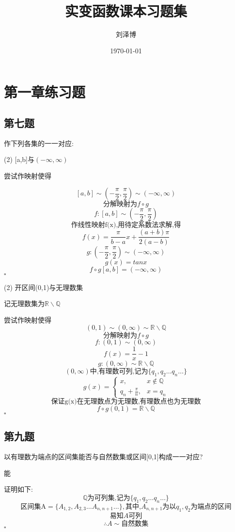 \documentclass[a4paper]{article}
\title{实变函数课本习题集}
\author{刘泽博}
\date{\today}
\begin{document}
    \maketitle
    \tableofcontents
    \section{第一章练习题}
    \subsection{第七题}
    作下列各集的一一对应:

    (2) [a,b]与$(-\infty,\infty)$
    
    尝试作映射使得

    \[[a,b] \sim (-\frac{\pi}{2},\frac{\pi}{2}) \sim (-\infty,\infty)\]
    \[\text{分解映射为}f\circ g\]
    \[f:[a,b] \sim (-\frac{\pi}{2},\frac{\pi}{2})\]
    \[\text{作线性映射f(x),用待定系数法求解,得}\]
    \[f(x)=\frac{\pi}{b-a}x+\frac{(a+b)\pi}{2(a-b)}\]
    \[g:(-\frac{\pi}{2},\frac{\pi}{2}) \sim (-\infty,\infty)\]
    \[g(x)=tanx\]
    \[f\circ g [a,b] =(-\infty,\infty)\]
    \hfill $\square$

    (2) 开区间(0,1)与无理数集

    记无理数集为$\mathbb{R}\backslash\mathbb{Q}$

    尝试作映射使得
    \[(0,1) \sim (0,\infty) \sim \mathbb{R}\backslash\mathbb{Q}\]
    \[\text{分解映射为}f\circ g\]
    \[f:(0,1) \sim (0,\infty)\]
    \[f(x)=\frac{1}{x}-1\]
    \[g:(0,\infty) \sim \mathbb{R}\backslash\mathbb{Q}\]
    \[(0,\infty)\text{中,有理数可列,记为} \{q_1,q_2\ldots q_n \ldots\}\]
    \[
    g(x) =
    \begin{cases}
    x, & x \not\in \mathbb{Q} \\
    q_n+\frac{\pi}{n}, & x = q_n
    \end{cases}
    \]
    \[\text{保证g(x)在无理数点为无理数,有理数点也为无理数}\]
    \[f\circ g (0,1)= \mathbb{R}\backslash\mathbb{Q}\]
    \hfill $\square$

    \subsection{第九题}
    以有理数为端点的区间集能否与自然数集或区间[0,1]构成一一对应?

    能

    证明如下:
    \[\mathbb{Q}\text{为可列集,记为} \{q_1,q_2\ldots q_n \ldots\}\]
    \[\text{区间集A}=\{A_{1,2},A_{2,3}\ldots A_{n,n+1} \ldots\},\text{其中,}A_{n,n+1}\text{为以}q_1,q_2\text{为端点的区间}\]
    \[\text{易知}A可列\]
    \[\therefore A \sim \text{自然数集}\]
    \hfill $\square$
\end{document}
